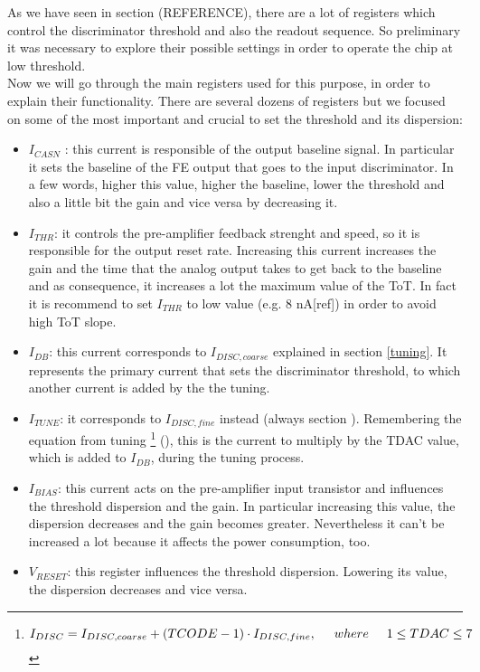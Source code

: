 As we have seen in section (REFERENCE), there are a lot of registers which control the discriminator threshold and also the readout sequence. So preliminary it was necessary to explore their possible settings in order to operate the chip at low threshold.\\

Now we will go through the main registers used for this purpose, in order to explain their functionality. There are several dozens of registers but we focused on some of the most important and crucial to set the threshold and its dispersion:

\begin{itemize}
\label{currents}
\item \textit{$I_{CASN}$} : this current is responsible of the output baseline signal. In particular it sets the baseline of the FE output that goes to the input discriminator. In a few words, higher this value, higher the baseline, lower the threshold and also a little bit the gain and vice versa by decreasing it.
\item \textit{$I_{THR}$}: it controls the pre-amplifier feedback strenght and speed, so it is responsible for the output reset rate. Increasing this current increases the gain and the time that the analog output takes to get back to the baseline and as consequence, it increases a lot the maximum value of the ToT. In fact it is recommend to set $I_{THR}$ to low value (e.g. 8 nA[ref]) in order to avoid high ToT slope.
\item \textit{$I_{DB}$}: this current corresponds to \textbf{$I_{DISC,coarse}$} explained in section \vref{tuning}. It represents the primary current that sets the discriminator threshold, to which another current is added by the the tuning.
\item \textit{$I_{TUNE}$}: it corresponds to \textbf{$I_{DISC,fine}$} instead (always section ). Remembering the equation from tuning \footnote{
\begin{equation}
I_{DISC} = I_{DISC, coarse} + (TCODE - 1) \cdot I_{DISC,fine},  \hspace{.5cm}	where \hspace{.5cm} 1 \leq TDAC \leq 7
\end{equation}
} (), this is the current to multiply by the TDAC value, which is added to $I_{DB}$, during the tuning process.
\item \textit{$I_{BIAS}$}: this current acts on the pre-amplifier input transistor and influences the threshold dispersion and the gain. In particular increasing this value, the dispersion decreases and the gain becomes greater. Nevertheless it can't be increased a lot because it affects the power consumption, too. %
\item \textit{$V_{RESET}$}: this register influences the threshold dispersion. Lowering its value, the dispersion decreases and vice versa.
\end{itemize}

